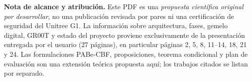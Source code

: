 \documentclass[10pt,a4paper,twocolumn]{article}
\begin{document}
\vspace{2mm}
\noindent\small\color{ink}\textbf{Nota de alcance y atribución.} Este PDF es una \emph{propuesta científica original por desarrollar}, no una publicación revisada por pares ni una certificación de seguridad del Unitree G1. La información sobre arquitectura, fases, gemelo digital, GR00T y estado del proyecto proviene exclusivamente de la presentación entregada por el usuario (27 páginas), en particular páginas 2, 5, 8, 11--14, 18, 21 y 24. Las formulaciones PABe-CBF, proposiciones, teorema condicional y plan de evaluación son una extensión teórica propuesta aquí; los trabajos citados se listan por separado.\normalsize
\end{document}
